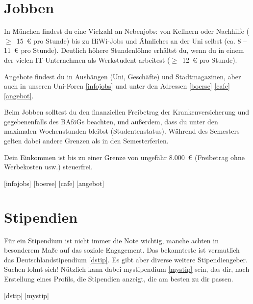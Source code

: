 \section{Jobben}
In München findest du eine Vielzahl an Nebenjobs: von Kellnern oder Nachhilfe ($\geq$~15~€ pro Stunde) bis zu HiWi-Jobs und Ähnliches an der Uni selbst (ca. 8 -- 11~€ pro Stunde). Deutlich höhere Stundenlöhne erhältst du, wenn du in einem der vielen IT-Unternehmen als Werkstudent arbeitest ($\geq$~12~€ pro Stunde).

Angebote findest du in Aushängen (Uni, Geschäfte) und Stadtmagazinen, aber auch in unseren Uni-Foren \ref{infojobs} und unter den Adressen
\ref{boerse} \ref{cafe} \ref{angebot}.

Beim Jobben solltest du den finanziellen Freibetrag der Krankenversicherung und gegebenenfalls des BAföGs beachten, und außerdem, dass du unter den maximalen Wochenstunden bleibst (Studentenstatus). Während des Semesters gelten dabei andere Grenzen als in den Semesterferien.

Dein Einkommen ist bis zu einer Grenze von ungefähr 8.000~€ (Freibetrag ohne Werbekosten usw.) steuerfrei.

\begin{urlList}
	[infojobs]
	[boerse]
	[cafe]
	[angebot]
\end{urlList}



\section{Stipendien}
Für ein Stipendium ist nicht immer die Note wichtig, manche achten in besonderem Maße auf das soziale Engagement.
Das bekannteste ist vermutlich das Deutschlandstipendium \ref{dstip}. Es gibt aber diverse weitere Stipendiengeber.
Suchen lohnt sich! Nützlich kann dabei mystipendium \ref{mystip} sein, das dir, nach Erstellung eines Profils, die
Stipendien anzeigt, die am besten zu dir passen.

\begin{urlList}
	[dstip]
	[mystip]
\end{urlList}

